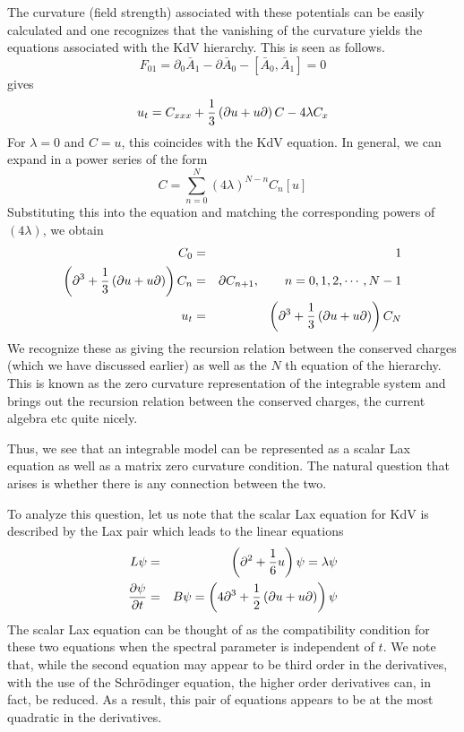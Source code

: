 \documentclass[a4paper,11pt]{article}
\begin{document}
The curvature (field strength) associated with these potentials can be easily
calculated and one recognizes that the vanishing of the curvature
yields the equations associated with the KdV hierarchy. This is seen
as follows.
\begin{equation}
F_{01} = \partial_{0}\bar{A}_{1} - \partial \bar{A}_{0} - \left[
\bar{A}_{0} , \bar{A}_{1} \right] = 0
\end{equation}
gives
\begin{equation}
u_{t} = C_{xxx} + {1\over 3} \left(\partial u + u \partial\right) C -
4 \lambda C_{x}
\end{equation}
For $\lambda = 0$ and $C = u$, this coincides with the KdV
equation. In general, we can expand in a power series of the form
\begin{equation}
C = \sum_{n=0}^{N} (4\lambda)^{N-n} C_{n}[u]
\end{equation} 
Substituting this into the equation and matching the corresponding
powers of $(4\lambda)$, we obtain
\begin{eqnarray}
C_{0} & = & 1\nonumber\\
\left(\partial^{3} + {1\over 3} \left(\partial u + u
\partial\right)\right) C_{n} & = & \partial C_{n+1},\qquad n =
0,1,2,\cdots , N-1\nonumber\\
u_{t} & = & \left(\partial^{3} + {1\over 3} \left(\partial u + u
\partial\right)\right) C_{N}
\end{eqnarray}
We recognize these as giving the recursion relation between the
conserved charges (which we have discussed earlier) as well as the $N$
th equation of the hierarchy. This is known as the zero curvature
representation of the integrable system and brings out the recursion
relation between the conserved charges, the current algebra etc quite
nicely.


Thus, we see that an integrable model can be represented as a scalar
Lax equation as well as a matrix zero curvature condition. The
natural question that arises is whether there is any connection
between the two.

To analyze this question, let us note that the scalar Lax equation for
KdV is described by the Lax pair which leads to the linear equations
\begin{eqnarray}
L \psi & = & \left(\partial^{2} + {1\over 6} u \right) \psi = \lambda
\psi\nonumber\\
{\partial \psi\over \partial t} & = & B \psi = \left(4 \partial^{3} +
{1\over 2} \left(\partial u + u \partial \right)\right)\psi
\end{eqnarray}
The scalar Lax equation can be thought of as the compatibility
condition for these two equations when the spectral parameter is
independent of $t$. We note that, while the second equation may appear
to  be third  order 
in the derivatives, with the use of the Schr\"{o}dinger equation, the
higher order derivatives can, in fact, be reduced. As a result, this
pair of equations appears to be at the most quadratic in the
derivatives. 
\end{document}
